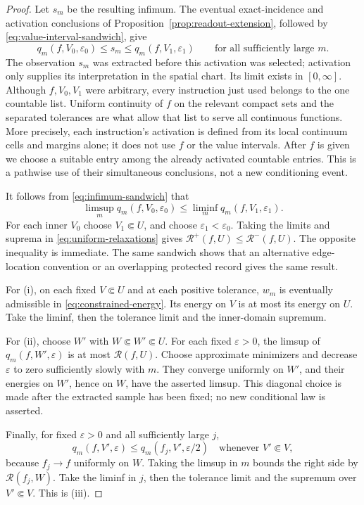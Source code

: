 \begin{proof}
Let \(s_m\) be the resulting infimum.  The eventual exact-incidence and
activation conclusions of Proposition~\ref{prop:readout-extension}, followed
by \eqref{eq:value-interval-sandwich}, give
\begin{equation}\label{eq:infimum-sandwich}
 q_m(f,V_0,\varepsilon_0)\le s_m
       \le q_m(f,V_1,\varepsilon_1)
 \qquad\text{for all sufficiently large }m.
\end{equation}
The observation \(s_m\) was extracted before this activation was selected;
activation only supplies its interpretation in the spatial chart.  Its
limit exists in \([0,\infty]\).  Although \(f,V_0,V_1\) were arbitrary,
every instruction just used belongs to the one countable list.  Uniform
continuity of \(f\) on the relevant compact sets and the separated
tolerances are what allow that list to serve all continuous functions.
More precisely, each instruction's activation is defined from its local
continuum cells and margins alone; it does not use \(f\) or the value
intervals.  After \(f\) is given we choose a suitable entry among the
already activated countable entries.  This is a pathwise use of their
simultaneous conclusions, not a new conditioning event.

It follows from \eqref{eq:infimum-sandwich} that
\[
 \limsup_m q_m(f,V_0,\varepsilon_0)
 \le \liminf_m q_m(f,V_1,\varepsilon_1).
\]
For each inner \(V_0\) choose \(V_1\Subset U\), and choose
\(\varepsilon_1<\varepsilon_0\).  Taking the limits and suprema in
\eqref{eq:uniform-relaxations} gives
\(\mathcal R^+(f,U)\le\mathcal R^-(f,U)\).  The opposite inequality is
immediate.  The same sandwich shows that an alternative edge-location
convention or an overlapping protected record gives the same result.

For (i), on each fixed \(V\Subset U\) and at each positive tolerance,
\(w_m\) is eventually admissible in \eqref{eq:constrained-energy}.
Its energy on \(V\) is at most its energy on \(U\).  Take the liminf,
then the tolerance limit and the inner-domain supremum.

For (ii), choose \(W'\) with \(W\Subset W'\Subset U\).  For each fixed
\(\varepsilon>0\), the limsup of \(q_m(f,W',\varepsilon)\) is at most
\(\mathcal R(f,U)\).  Choose approximate minimizers and decrease
\(\varepsilon\) to zero sufficiently slowly with \(m\).  They converge
uniformly on \(W'\), and their energies on \(W'\), hence on \(W\), have the
asserted limsup.  This diagonal choice is made after the extracted sample
has been fixed; no new conditional law is asserted.

Finally, for fixed \(\varepsilon>0\) and all sufficiently large \(j\),
\[
 q_m(f,V',\varepsilon)
 \le q_m(f_j,V',\varepsilon/2)
 \quad\text{whenever }V'\Subset V,
\]
because \(f_j\to f\) uniformly on \(W\).  Taking the limsup in \(m\)
bounds the right side by \(\mathcal R(f_j,W)\).  Take the liminf in \(j\),
then the tolerance limit and the supremum over \(V'\Subset V\).  This is
(iii).
\end{proof}

